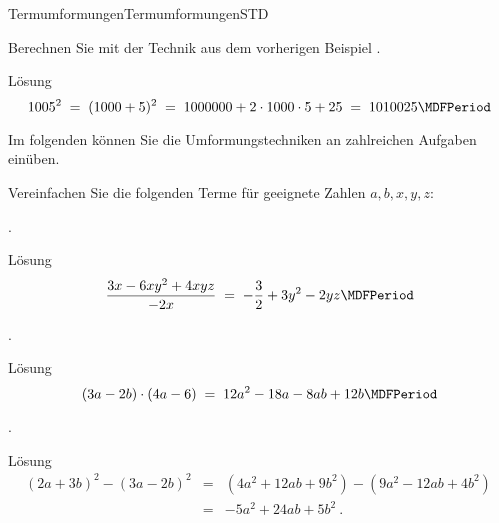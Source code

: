 \begin{MXContent}{Termumformungen}{Termumformungen}{STD}
\begin{MExercise}
Berechnen Sie mit der Technik aus dem vorherigen Beispiel .

\begin{MHint}{Lösung}
$$1005^2 \;=\; (1000+5)^2\;=\; 1000000+2\cdot 1000\cdot 5+25 \;=\; 1010025 \MDFPeriod $$\end{MHint}
\end{MExercise}

Im folgenden  können Sie die Umformungstechniken an zahlreichen Aufgaben einüben.

\end{MXContent}

\begin{MExercises}
\begin{MExercise}
Vereinfachen Sie die folgenden Terme für geeignete Zahlen $a,b,x,y,z$:
\begin{MExerciseItems}
\item{. \begin{MHint}{Lösung}$$\Mdfrac{3x -6x y^2+4 x y z}{-2x}\;=\; -\Mdfrac32+3y^2-2y z \MDFPeriod  $$\end{MHint}}
\item{. \begin{MHint}{Lösung} $$(3a-2b)\cdot(4a-6)\;=\; 12a^2-18a-8a b+12b\MDFPeriod  $$\end{MHint}}
\item{. \begin{MHint}{Lösung} \begin{eqnarray*}(2a+3b)^2-(3a-2b)^2&=& (4a^2+12a b+9b^2)-(9a^2-12a b+4b^2)\ \\ &=& -5a^2+24a b+5b^2  \: . \end{eqnarray*}\end{MHint}}

\end{MExerciseItems}
\end{MExercise}
\end{MExercises}
